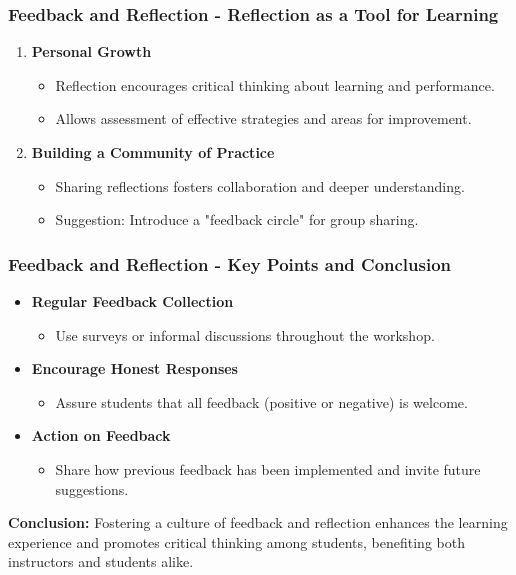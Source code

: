 \documentclass[aspectratio=169]{beamer}
\begin{document}
\begin{frame}[fragile]
    \frametitle{Feedback and Reflection - Reflection as a Tool for Learning}
    \begin{enumerate}
        \item \textbf{Personal Growth}
        \begin{itemize}
            \item Reflection encourages critical thinking about learning and performance.
            \item Allows assessment of effective strategies and areas for improvement.
        \end{itemize}
        
        \item \textbf{Building a Community of Practice}
        \begin{itemize}
            \item Sharing reflections fosters collaboration and deeper understanding.
            \item Suggestion: Introduce a "feedback circle" for group sharing.
        \end{itemize}
    \end{enumerate}
\end{frame}

\begin{frame}[fragile]
    \frametitle{Feedback and Reflection - Key Points and Conclusion}
    \begin{itemize}
        \item \textbf{Regular Feedback Collection}
        \begin{itemize}
            \item Use surveys or informal discussions throughout the workshop.
        \end{itemize}

        \item \textbf{Encourage Honest Responses}
        \begin{itemize}
            \item Assure students that all feedback (positive or negative) is welcome.
        \end{itemize}

        \item \textbf{Action on Feedback}
        \begin{itemize}
            \item Share how previous feedback has been implemented and invite future suggestions.
        \end{itemize}
    \end{itemize}
    
    \vspace{0.5cm}
    \textbf{Conclusion:}  
    Fostering a culture of feedback and reflection enhances the learning experience and promotes critical thinking among students, benefiting both instructors and students alike.
\end{frame}
\end{document}
